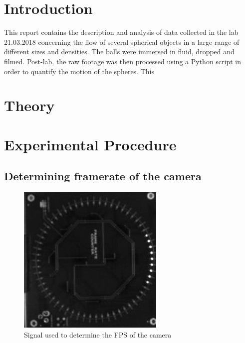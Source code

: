 \documentclass[11pt,a4paper]{article}
\begin{document}
\begin{multicols*}{2}
\section{\label{sect:intro}Introduction}
  This report contains the description and analysis of data collected in the lab 21.03.2018 concerning the flow of several spherical objects in a large range of different sizes and densities. The balls were immersed in fluid, dropped and filmed. Post-lab, the raw footage was then processed using a Python script in order to quantify the motion of the spheres. This 

\section{\label{sect:theory}Theory}

\section{\label{section:experimental}Experimental Procedure}
  \subsection{Determining framerate of the camera}
    
    

    \begin{figure}[H]
      \center
      \includegraphics[width=7cm]{scripts/figs/sync_fps.png}
      \caption{Signal used to determine the FPS of the camera}
      \label{fig:FpsSignal}
    \end{figure}
  


\end{multicols*}
\end{document}
